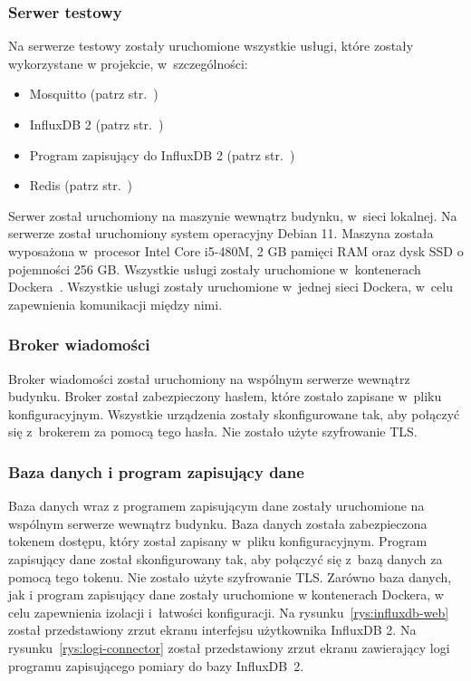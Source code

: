 \subsubsection{Serwer testowy}
Na serwerze testowy zostały uruchomione wszystkie usługi, które zostały wykorzystane w projekcie, w~szczególności:
\begin{itemize}
    \item Mosquitto (patrz str.~\pageref{impl:mosquitto})
    \item InfluxDB 2 (patrz str.~\pageref{impl:db})
    \item Program zapisujący do InfluxDB 2 (patrz str.~\pageref{impl:save})
    \item Redis (patrz str.~\pageref{impl:redis})
\end{itemize}
Serwer został uruchomiony na maszynie wewnątrz budynku, w~sieci lokalnej.
Na serwerze został uruchomiony system operacyjny Debian 11.
Maszyna została wyposażona w~procesor Intel Core i5-480M, 2 GB pamięci RAM oraz dysk SSD o pojemności 256 GB.
Wszystkie usługi zostały uruchomione w~kontenerach Dockera~\cite{tool:docker}.
Wszystkie usługi zostały uruchomione w~jednej sieci Dockera, w~celu zapewnienia komunikacji między nimi.

\subsubsection{Broker wiadomości}
Broker wiadomości został uruchomiony na wspólnym serwerze wewnątrz budynku.
Broker został zabezpieczony hasłem, które zostało zapisane w~pliku konfiguracyjnym.
Wszystkie urządzenia zostały skonfigurowane tak, aby połączyć się z~brokerem za pomocą tego hasła.
Nie zostało użyte szyfrowanie TLS.

\subsubsection{Baza danych i program zapisujący dane}
Baza danych wraz z programem zapisującym dane zostały uruchomione na wspólnym serwerze wewnątrz budynku.
Baza danych została zabezpieczona tokenem dostępu, który został zapisany w~pliku konfiguracyjnym.
Program zapisujący dane został skonfigurowany tak, aby połączyć się z~bazą danych za pomocą tego tokenu.
Nie zostało użyte szyfrowanie TLS.
Zarówno baza danych, jak i program zapisujący dane zostały uruchomione w kontenerach Dockera, w celu zapewnienia izolacji i~łatwości konfiguracji.
Na rysunku~\ref{rys:influxdb-web} został przedstawiony zrzut ekranu interfejsu użytkownika InfluxDB 2.
Na rysunku~\ref{rys:logi-connector} został przedstawiony zrzut ekranu zawierający logi programu zapisującego pomiary do bazy InfluxDB~2.

